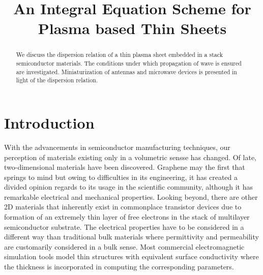 \documentclass[conference, 10pt]{IEEEtran}
\renewcommand{\^}{\hat}  %
\begin{document}
\title{An Integral Equation Scheme for Plasma based Thin Sheets}


\author{
\and
{}
}
\maketitle


%
\begin{abstract}
  We discuss the dispersion relation of a thin plasma sheet embedded in a stack semiconductor materials. The conditions under which propagation of wave is ensured are investigated. Miniaturization of antennas and microwave devices is presented in light of the dispersion relation.
\end{abstract}

\IEEEpeerreviewmaketitle
\section{Introduction}
With the advancements in semiconductor manufacturing techniques, our perception of materials existing only in a volumetric sensse has changed. Of late, two-dimensional materials have been discovered. Graphene may the first that springs to mind but owing to difficulties in its engineering, it has created a divided opinion regards to its usage in the scientific community, although it has remarkable electrical and mechanical properties. Looking beyond, there are other 2D materials that inherently exist in commonplace transistor devices due to formation of an extremely thin layer of free electrons in the stack of multilayer semiconductor substrate. The electrical properties have to be considered in a different way than traditional bulk materials where permittivity and permeability are customarily considered in a bulk sense. Most commercial electromagnetic simulation tools model thin structures with equivalent surface conductivity where the thickness is incorporated in computing the corresponding parameters.
\end{document}
